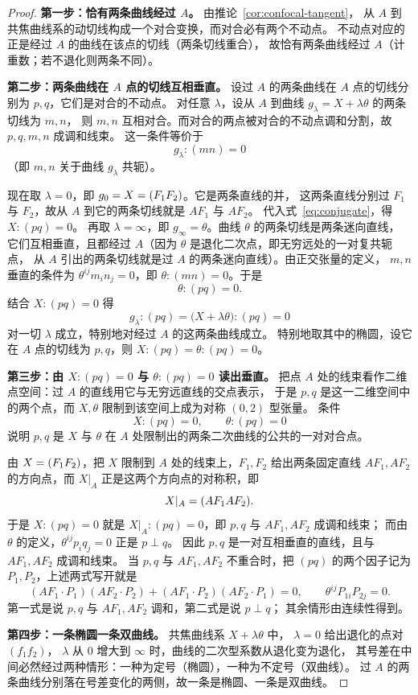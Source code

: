 \begin{proof}
\textbf{第一步：恰有两条曲线经过 $A$。} 由推论~\ref{cor:confocal-tangent}，
从 $A$ 到共焦曲线系的动切线构成一个对合变换，而对合必有两个不动点。
不动点对应的正是经过 $A$ 的曲线在该点的切线（两条切线重合），
故恰有两条曲线经过 $A$（计重数；若不退化则两条不同）。

\textbf{第二步：两条曲线在 $A$ 点的切线互相垂直。}
设过 $A$ 的两条曲线在 $A$ 点的切线分别为 $p,q$，它们是对合的不动点。
对任意 $\lambda$，设从 $A$ 到曲线 $g_\lambda=X+\lambda\theta$ 的两条切线为 $m,n$，
则 $m,n$ 互相对合。而对合的两点被对合的不动点调和分割，故 $p,q,m,n$ 成调和线束。
这一条件等价于
\begin{equation}\label{eq:conjugate}
g_\lambda:(mn)=0
\end{equation}
（即 $m,n$ 关于曲线 $g_\lambda$ 共轭）。

现在取 $\lambda=0$，即 $g_0=X=(F_1F_2)$。它是两条直线的并，
这两条直线分别过 $F_1$ 与 $F_2$，故从 $A$ 到它的两条切线就是 $AF_1$ 与 $AF_2$。
代入式~\eqref{eq:conjugate}，得 $X:(pq)=0$。
再取 $\lambda=\infty$，即 $g_\infty=\theta$。曲线 $\theta$ 的两条切线是两条迷向直线，
它们互相垂直，且都经过 $A$（因为 $\theta$ 是退化二次点，即无穷远处的一对复共轭点，
从 $A$ 引出的两条切线就是过 $A$ 的两条迷向直线）。由正交张量的定义，
$m,n$ 垂直的条件为 $\theta^{ij}m_in_j=0$，即 $\theta:(mn)=0$。于是
\[
\theta:(pq)=0 .
\]
结合 $X:(pq)=0$ 得
\[
g_\lambda:(pq)=\bigl(X+\lambda\theta\bigr):(pq)=0
\]
对一切 $\lambda$ 成立，特别地对经过 $A$ 的这两条曲线成立。
特别地取其中的椭圆，设它在 $A$ 点的切线为 $p,q$，则
$X:(pq)=\theta:(pq)=0$。

\textbf{第三步：由 $X:(pq)=0$ 与 $\theta:(pq)=0$ 读出垂直。}
把点 $A$ 处的线束看作二维点空间：过 $A$ 的直线用它与无穷远直线的交点表示，
于是 $p,q$ 是这一二维空间中的两个点，而 $X,\theta$ 限制到该空间上成为对称 $(0,2)$ 型张量。
条件
\[
X:(pq)=0,\qquad \theta:(pq)=0
\]
说明 $p,q$ 是 $X$ 与 $\theta$ 在 $A$ 处限制出的两条二次曲线的公共的一对对合点。

由 $X=(F_1F_2)$，把 $X$ 限制到 $A$ 处的线束上，$F_1,F_2$ 给出两条固定直线
$AF_1,AF_2$ 的方向点，而 $X|_A$ 正是这两个方向点的对称积，即
\[
X|_A=(AF_1AF_2).
\]
于是 $X:(pq)=0$ 就是 $X|_A:(pq)=0$，即 $p,q$ 与 $AF_1,AF_2$ 成调和线束；
而由 $\theta$ 的定义，$\theta^{ij}p_iq_j=0$ 正是 $p\perp q$。
因此 $p,q$ 是一对互相垂直的直线，且与 $AF_1,AF_2$ 成调和线束。
当 $p,q$ 与 $AF_1,AF_2$ 不重合时，把 $(pq)$ 的两个因子记为 $P_1,P_2$，上述两式写开就是
\[
(AF_1\cdot P_1)(AF_2\cdot P_2)+(AF_1\cdot P_2)(AF_2\cdot P_1)=0,
\qquad \theta^{ij}P_{1i}P_{2j}=0 .
\]
第一式是说 $p,q$ 与 $AF_1,AF_2$ 调和，第二式是说 $p\perp q$；
其余情形由连续性得到。

\textbf{第四步：一条椭圆一条双曲线。} 共焦曲线系 $X+\lambda\theta$ 中，
$\lambda=0$ 给出退化的点对 $(f_1f_2)$，
$\lambda$ 从 $0$ 增大到 $\infty$ 时，曲线的二次型系数从退化变为退化，
其号差在中间必然经过两种情形：一种为定号（椭圆），一种为不定号（双曲线）。
过 $A$ 的两条曲线分别落在号差变化的两侧，故一条是椭圆、一条是双曲线。
\end{proof}

